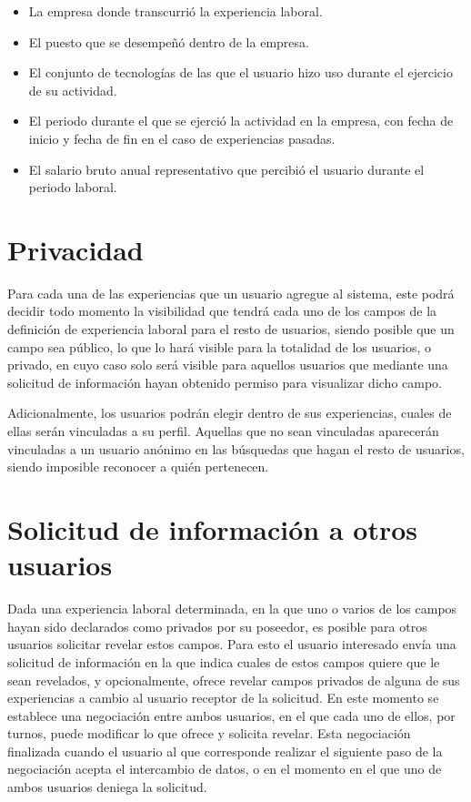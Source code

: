 \documentclass[a4paper, 12pt]{book}
\begin{document}
\begin{itemize}
  \item La empresa donde transcurrió la experiencia laboral.
  \item El puesto que se desempeñó dentro de la empresa.
  \item El conjunto de tecnologías de las que el usuario hizo uso durante el ejercicio de su actividad.
  \item El periodo durante el que se ejerció la actividad en la empresa, con fecha de inicio y fecha de fin en el caso de experiencias pasadas.
  \item El salario bruto anual representativo que percibió el usuario durante el periodo laboral.
\end{itemize}

\section{Privacidad}
\label{sec:intro_privacity}
Para cada una de las experiencias que un usuario agregue al sistema, este podrá decidir todo momento la visibilidad que tendrá cada uno de los campos de la definición de experiencia laboral para el resto de usuarios, siendo posible que un campo sea público, lo que lo hará visible para la totalidad de los usuarios, o privado, en cuyo caso solo será visible para aquellos usuarios que mediante  una solicitud de información hayan obtenido permiso para visualizar dicho campo.

Adicionalmente, los usuarios podrán elegir dentro de sus experiencias, cuales de ellas serán vinculadas a su perfil. Aquellas que no sean vinculadas aparecerán vinculadas a un usuario anónimo en las búsquedas que hagan el resto de usuarios, siendo imposible reconocer a quién pertenecen.

\section{Solicitud de información a otros usuarios}
\label{sec:intro_inforequest}
Dada una experiencia laboral determinada, en la que uno o varios de los campos hayan sido declarados como privados por su poseedor, es posible para otros usuarios solicitar revelar estos campos. 
Para esto el usuario interesado envía una solicitud de información en la que indica cuales de estos campos quiere que le sean revelados, y opcionalmente, ofrece revelar campos privados de alguna de sus experiencias a cambio al usuario receptor de la solicitud.
En este momento se establece una negociación entre ambos usuarios, en el que cada uno de ellos, por turnos, puede modificar lo que ofrece y solicita revelar. Esta negociación finalizada cuando el usuario al que corresponde realizar el siguiente paso de la negociación acepta el intercambio de datos, o en el momento en el que uno de ambos usuarios deniega la solicitud.
\end{document}
